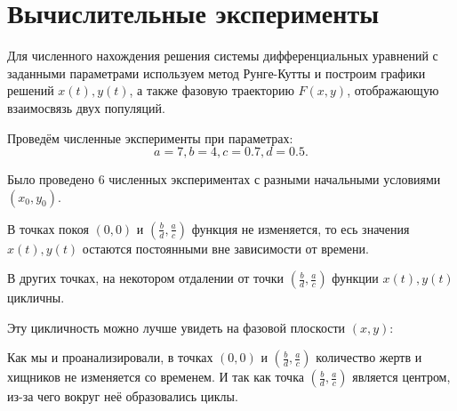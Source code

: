 \pagebreak

\section{Вычислительные эксперименты}
	Для численного нахождения решения системы дифференциальных уравнений с заданными параметрами используем метод Рунге-Кутты и построим графики решений \( x(t), y(t) \), а также фазовую траекторию \( F(x, y) \), отображающую взаимосвязь двух популяций.

	Проведём численные эксперименты при параметрах:
	\begin{equation*}
		a = 7, b = 4, c = 0.7, d = 0.5.
	\end{equation*}

	Было проведено 6 численных экспериментах с разными начальными условиями \( \left(x_0, y_0 \right) \).

	В точках покоя \( (0, 0) \) и \( \left( \frac{b}{d}, \frac{a}{c} \right) \) функция не изменяется, то есь значения \( x(t), y(t) \) остаются постоянными вне зависимости от времени.



	В других точках, на некотором отдалении от точки \( \left( \frac{b}{d}, \frac{a}{c} \right) \) функции \( x(t), y(t) \) цикличны.


	Эту цикличность можно лучше увидеть на фазовой плоскости \( \left( x, y \right) \):


	Как мы и проанализировали, в точках \( (0, 0) \) и  \( \left(\frac{b}{d}, \frac{a}{c} \right) \) количество жертв и хищников не изменяется со временем. И так как точка \( \left(\frac{b}{d}, \frac{a}{c} \right) \) является центром, из-за чего вокруг неё образовались циклы.


\pagebreak